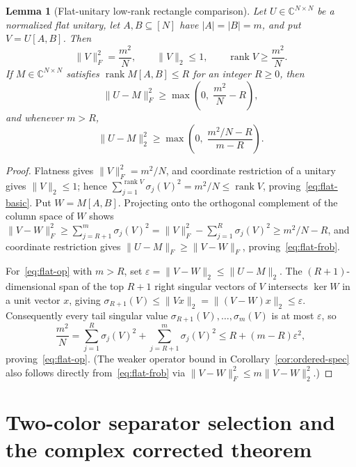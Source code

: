 \documentclass[11pt,reqno]{amsart}
\numberwithin{equation}{section}
\newtheorem{lemma}[theorem]{Lemma}
\theoremstyle{definition}
\theoremstyle{remark}
\newcommand{\C}{\mathbb{C}}
\newcommand{\rank}{\operatorname{rank}}
\begin{document}
\begin{lemma}[Flat-unitary low-rank rectangle comparison]
\label{lem:flat-spec}
Let $U\in\C^{N\times N}$ be a normalized flat unitary, let $A,B\subseteq[N]$ have $|A|=|B|=m$, and put $V = U[A,B]$. Then
\begin{equation}
\label{eq:flat-basic}
\|V\|_F^2 = \frac{m^2}{N},\qquad \|V\|_2\le 1,\qquad \rank V \ge \frac{m^2}{N}.
\end{equation}
If $M\in\C^{N\times N}$ satisfies $\rank M[A,B]\le R$ for an integer $R\ge 0$, then
\begin{equation}
\label{eq:flat-frob}
\|U - M\|_F^2 \ge \max\!\left(0,\; \frac{m^2}{N} - R\right),
\end{equation}
and whenever $m > R$,
\begin{equation}
\label{eq:flat-op}
\|U - M\|_2^2 \ge \max\!\left(0,\; \frac{m^2/N - R}{m - R}\right).
\end{equation}
\end{lemma}

\begin{proof}
Flatness gives $\|V\|_F^2 = m^2/N$, and coordinate restriction of a unitary gives $\|V\|_2\le 1$; hence $\sum_{j=1}^{\rank V}\sigma_j(V)^2 = m^2/N \le \rank V$, proving~\eqref{eq:flat-basic}. Put $W = M[A,B]$. Projecting onto the orthogonal complement of the column space of $W$ shows $\|V-W\|_F^2 \ge \sum_{j=R+1}^m \sigma_j(V)^2 = \|V\|_F^2 - \sum_{j=1}^R \sigma_j(V)^2 \ge m^2/N - R$, and coordinate restriction gives $\|U-M\|_F\ge \|V-W\|_F$, proving~\eqref{eq:flat-frob}.

For~\eqref{eq:flat-op} with $m > R$, set $\varepsilon = \|V - W\|_2\le \|U - M\|_2$. The $(R+1)$-dimensional span of the top $R+1$ right singular vectors of $V$ intersects $\ker W$ in a unit vector $x$, giving $\sigma_{R+1}(V)\le \|Vx\|_2 = \|(V-W)x\|_2\le \varepsilon$. Consequently every tail singular value $\sigma_{R+1}(V),\ldots,\sigma_m(V)$ is at most $\varepsilon$, so
\[
\frac{m^2}{N} = \sum_{j=1}^R \sigma_j(V)^2 + \sum_{j=R+1}^m \sigma_j(V)^2 \le R + (m - R)\varepsilon^2,
\]
proving~\eqref{eq:flat-op}. (The weaker operator bound in Corollary~\ref{cor:ordered-spec} also follows directly from~\eqref{eq:flat-frob} via $\|V-W\|_F^2 \le m\|V-W\|_2^2$.)
\end{proof}

\section{Two-color separator selection and the complex corrected theorem}
\label{sec:complex}
\end{document}
